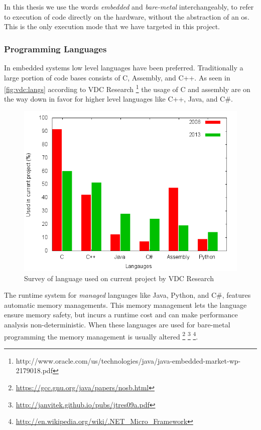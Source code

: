 In this thesis we use the words \emph{embedded} and \emph{bare-metal} interchangeably, to refer to execution of code directly on the hardware, without the abstraction of an \gls{os}.
This is the only execution mode that we have targeted in this project.

\subsubsection{Programming Languages}

In embedded systems low level languages have been preferred.
Traditionally a large portion of code bases consists of C, Assembly, and C++.
As seen in \autoref{fig:vdc:langs} according to VDC Research \footnote{http://www.oracle.com/us/technologies/java/java-embedded-market-wp-2179018.pdf} the usage of C and assembly are on the way down in favor for higher level languages like C++, Java, and C\#.

\begin{figure}[H]
  \begin{center}
    \includegraphics[scale=0.5]{figures/plots/langs.png}
  \end{center}
  \caption{Survey of language used on current project by VDC Research}
  \label{fig:vdc:langs}
\end{figure}

The runtime system for \emph{managed} languages like Java, Python, and C\#, features automatic memory managements.
This memory management lets the language ensure memory safety, but incurs a runtime cost and can make performance analysis non-deterministic.
When these languages are used for bare-metal programming the memory management is usually altered \footnote{\url{https://gcc.gnu.org/java/papers/nosb.html}} \footnote{\url{http://janvitek.github.io/pubs/jtres09a.pdf}} \footnote{\url{http://en.wikipedia.org/wiki/.NET_Micro_Framework}}.

